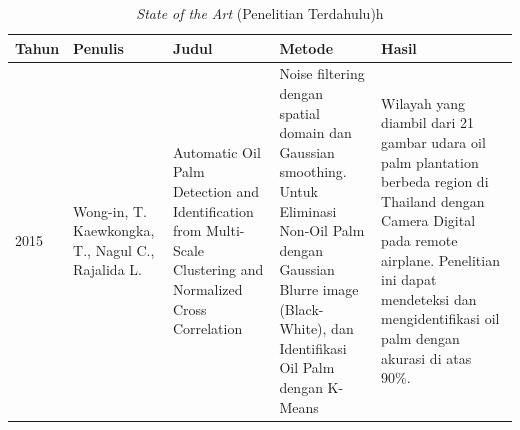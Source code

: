 \begin{singlespace}
	\begin{table}[H]
		\centering
		\caption{\textit{State of the Art} (Penelitian Terdahulu)h}
		\label{tbl:Start-of-The-Art}
		\begin{tabular}{|p{2cm}|p{2cm}|p{2cm}|p{2cm}|p{2cm}|}	
			\hline
			Tahun & Penulis & Judul & Metode & Hasil \\ \hline
			2015  & Wong-in, T. Kaewkongka, T., Nagul C.,   Rajalida L.                    & Automatic Oil Palm Detection and Identification from Multi-Scale Clustering and Normalized Cross Correlation                                         & Noise filtering dengan spatial domain dan Gaussian smoothing. Untuk Eliminasi Non-Oil Palm dengan Gaussian Blurre image (Black-White), dan Identifikasi Oil Palm dengan K-Means & Wilayah yang diambil dari 21 gambar udara oil palm plantation berbeda region di Thailand dengan Camera Digital pada remote airplane. Penelitian ini dapat mendeteksi dan mengidentifikasi oil palm dengan akurasi di atas 90\%.                                                                                   \\ \hline
			\end{tabular}
	\end{table}
\end{singlespace}

